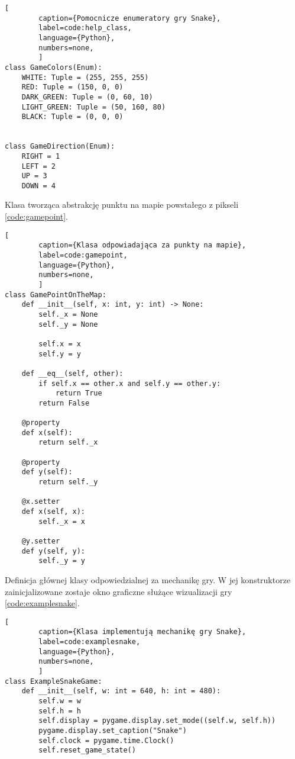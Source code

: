 \begin{onepage}
    \begin{lstlisting}[
        caption={Pomocnicze enumeratory gry Snake},
        label=code:help_class,
        language={Python},
        numbers=none,
        ]
class GameColors(Enum):
    WHITE: Tuple = (255, 255, 255)
    RED: Tuple = (150, 0, 0)
    DARK_GREEN: Tuple = (0, 60, 10)
    LIGHT_GREEN: Tuple = (50, 160, 80)
    BLACK: Tuple = (0, 0, 0)


class GameDirection(Enum):
    RIGHT = 1
    LEFT = 2
    UP = 3
    DOWN = 4
    \end{lstlisting}
\end{onepage}

\clearpage

Klasa tworząca abstrakcję punktu na mapie powstałego z pikseli \ref{code:gamepoint}.

\begin{onepage}
    \begin{lstlisting}[
        caption={Klasa odpowiadająca za punkty na mapie},
        label=code:gamepoint,
        language={Python},
        numbers=none,
        ]
class GamePointOnTheMap:
    def __init__(self, x: int, y: int) -> None:
        self._x = None
        self._y = None

        self.x = x
        self.y = y

    def __eq__(self, other):
        if self.x == other.x and self.y == other.y:
            return True
        return False

    @property
    def x(self):
        return self._x

    @property
    def y(self):
        return self._y

    @x.setter
    def x(self, x):
        self._x = x

    @y.setter
    def y(self, y):
        self._y = y
    \end{lstlisting}
\end{onepage}

Definicja głównej klasy odpowiedzialnej za mechanikę gry. W jej konstruktorze zainicjalizowane zostaje okno graficzne służące wizualizacji gry \ref{code:examplesnake}.

\begin{onepage}
    \begin{lstlisting}[
        caption={Klasa implementują mechanikę gry Snake},
        label=code:examplesnake,
        language={Python},
        numbers=none,
        ]
class ExampleSnakeGame:
    def __init__(self, w: int = 640, h: int = 480):
        self.w = w
        self.h = h
        self.display = pygame.display.set_mode((self.w, self.h))
        pygame.display.set_caption("Snake")
        self.clock = pygame.time.Clock()
        self.reset_game_state()
    \end{lstlisting}
\end{onepage}


